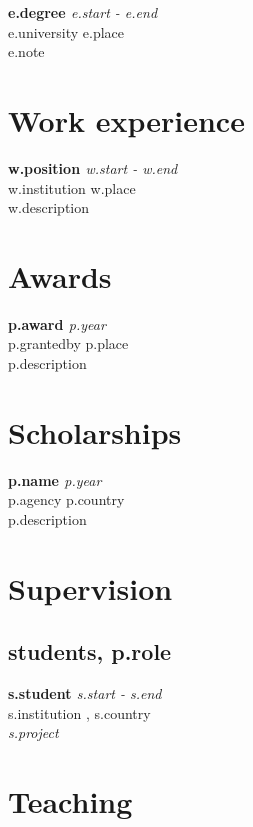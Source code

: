 \documentclass[10pt,letterpaper]{article} %
\newcommand{\cventry}[4]{ {\bf #1} \hfill {\em #2} \\ {\small \sc #3 \hfill  #4} }
\begin{document}
{%
    \cventry{ {{ e.degree }} }
    { {{ e.start }} - {{ e.end }} }
    { {{ e.university }} }
    { {{ e.place}} } \\
    {{ e.note }}
{%
\vspace{10pt}

\section*{Work experience} %

{%
    \cventry{ {{ w.position }} }
    { {{ w.start }} -   {{ w.end }} }
    { {{ w.institution }} }
    { {{ w.place }} }\\
    {{ w.description }}
{%

\section*{Awards}

{%
    \cventry{ {{ p.award }} }
    { {{ p.year }} }
    { {{ p.grantedby }} }
    { {{p.place}} }\\
    {{ p.description }}
{%

\section*{Scholarships}

{%
    \cventry{ {{ p.name }} }
    { {{ p.year }} }
    { {{ p.agency }} }
    { {{ p.country }} } \\
    {{ p.description }}
{%
\newpage

\section*{Supervision}

{%
\subsection*{ students, {{ p.role }}  }
    {%
        \cventry{  {{ s.student }}  }
        { {{ s.start }} - {{s.end}} }
        {  }
        { {{ s.institution }}, {{ s.country }} } \\
        {\it {{ s.project }} }
        {%
{%


\section*{Teaching}

}}}}}}}}}}}}
\end{document}
